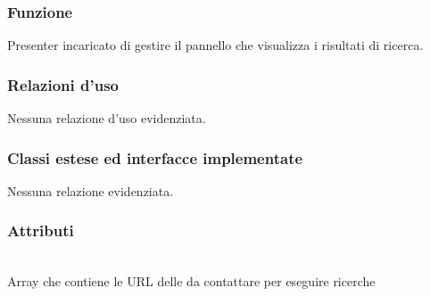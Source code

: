 
\subsubsection*{Funzione}
Presenter incaricato di gestire il pannello che visualizza i risultati di ricerca.

\subsubsection*{Relazioni d'uso}
Nessuna relazione d'uso evidenziata.

\subsubsection*{Classi estese ed interfacce implementate}
Nessuna relazione evidenziata.

\subsubsection*{Attributi}
\begin{description}
\item{}\\
Array che contiene le URL delle  da contattare per eseguire ricerche
\end{description}

